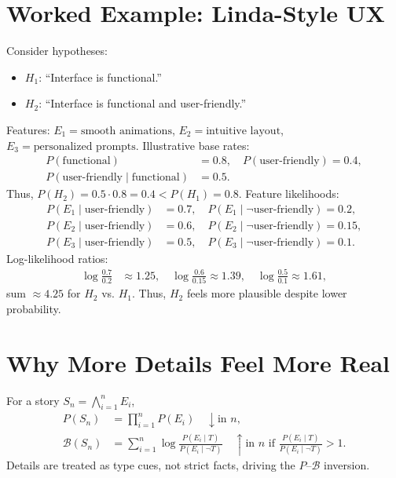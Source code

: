 \documentclass[openany]{book}
\begin{document}
\section{Worked Example: Linda-Style UX}
\label{sec:conj-example}
Consider hypotheses:
\begin{itemize}
  \item $H_1$: \textquotedblleft Interface is functional.\textquotedblright
  \item $H_2$: \textquotedblleft Interface is functional and user-friendly.\textquotedblright
\end{itemize}
Features: $E_1 = \text{smooth animations}$, $E_2 = \text{intuitive layout}$, $E_3 = \text{personalized prompts}$. Illustrative base rates:
\begin{align*}
P(\text{functional}) &= 0.8, \quad P(\text{user-friendly}) = 0.4, \\
P(\text{user-friendly} \mid \text{functional}) &= 0.5.
\end{align*}
Thus, $P(H_2) = 0.5 \cdot 0.8 = 0.4 < P(H_1) = 0.8$. Feature likelihoods:
\begin{align*}
P(E_1 \mid \text{user-friendly}) &= 0.7, \quad P(E_1 \mid \neg \text{user-friendly}) = 0.2, \\
P(E_2 \mid \text{user-friendly}) &= 0.6, \quad P(E_2 \mid \neg \text{user-friendly}) = 0.15, \\
P(E_3 \mid \text{user-friendly}) &= 0.5, \quad P(E_3 \mid \neg \text{user-friendly}) = 0.1.
\end{align*}
Log-likelihood ratios:
\begin{align*}
\log \frac{0.7}{0.2} &\approx 1.25, \quad \log \frac{0.6}{0.15} \approx 1.39, \quad \log \frac{0.5}{0.1} \approx 1.61,
\end{align*}
sum $\approx 4.25$ for $H_2$ vs. $H_1$. Thus, $H_2$ feels more plausible despite lower probability.

\section{Why More Details Feel More Real}
\label{sec:conj-why}
For a story $S_n = \bigwedge_{i=1}^n E_i$,
\begin{align*}
P(S_n) &= \prod_{i=1}^n P(E_i) \quad \downarrow \text{in } n, \\
\mathcal{B}(S_n) &= \sum_{i=1}^n \log \frac{P(E_i \mid T)}{P(E_i \mid \neg T)} \quad \uparrow \text{in } n \text{ if } \frac{P(E_i \mid T)}{P(E_i \mid \neg T)} > 1.
\end{align*}
Details are treated as type cues, not strict facts, driving the $P$--$\mathcal{B}$ inversion.
\end{document}
